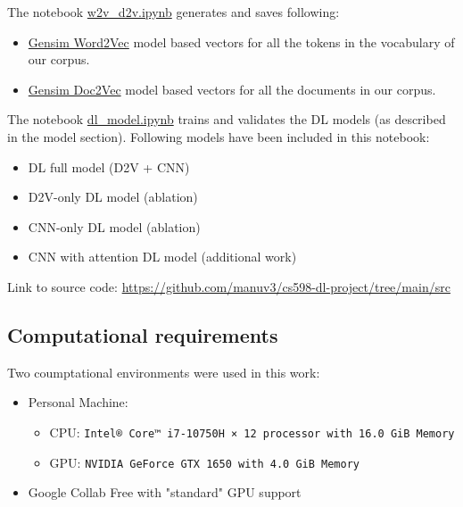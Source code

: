 \documentclass[11pt,a4paper]{article}
\begin{document}
The notebook \href{https://github.com/manuv3/cs598-dl-project/blob/main/src/w2v\_d2v.ipynb}{w2v\_d2v.ipynb} generates and saves following:
	\begin{itemize}
		\item \href{https://radimrehurek.com/gensim/models/word2vec.html}{Gensim Word2Vec} model based vectors for all the tokens in the vocabulary of our corpus.
		\item \href{https://radimrehurek.com/gensim/models/doc2vec.html}{Gensim Doc2Vec} model based vectors for all the documents in our corpus.
	\end{itemize}
	
The notebook \href{https://github.com/manuv3/cs598-dl-project/blob/main/src/dl\_model.ipynb}{dl\_model.ipynb} trains and validates the DL models (as described in the model section). Following models have been included in this notebook:
		\begin{itemize}
			\item DL full model (D2V + CNN)
			\item D2V-only DL model (ablation)
			\item CNN-only DL model (ablation)
			\item CNN with attention DL model (additional work)
		\end{itemize}

Link to source code: \url{https://github.com/manuv3/cs598-dl-project/tree/main/src}


\subsection{Computational requirements}

Two coumptational environments were used in this work:
\begin{itemize}
	\item Personal Machine: 
	\begin{itemize}
		\item CPU: \texttt{Intel® Core™ i7-10750H × 12 processor with 16.0 GiB Memory}
		\item GPU: \texttt{NVIDIA GeForce GTX 1650 with 4.0 GiB Memory}
	\end{itemize}
	\item Google Collab Free with "standard" GPU support
\end{itemize}
\end{document}
